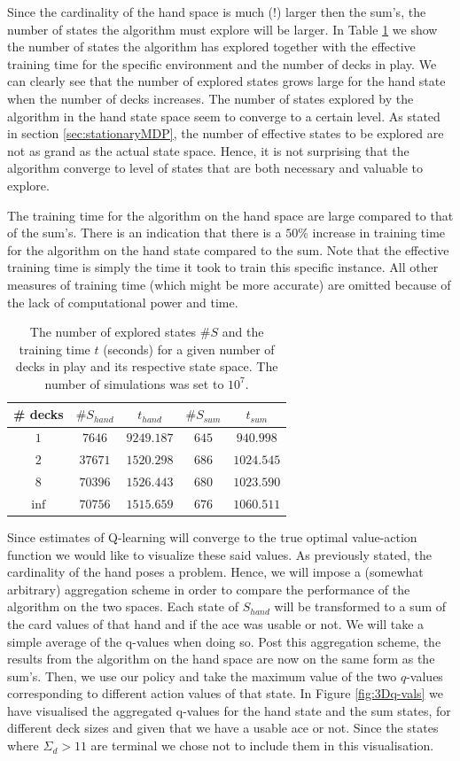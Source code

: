 Since the cardinality of the hand space is much (!) larger then the sum's, the number of states the algorithm must explore 
will be larger. In Table \ref{tab:state_visited} we show the number of states the algorithm has explored together with the 
effective training time for the specific environment and the number of decks in play. We can clearly see that the number of 
explored states grows large for the hand state when the number of decks increases. The number of states explored by the 
algorithm in the hand state space seem to converge to a certain level. As stated in section \ref{sec:stationaryMDP}, the 
number of effective states to be explored are not as grand as the actual state space. Hence, it is not surprising that the 
algorithm converge to level of states that are both necessary and valuable to explore. 

The training time for the algorithm on the hand space are large compared to that of the sum's. 
There is an indication that there is a $50\%$ increase in training time for the algorithm on the hand state compared to the 
sum. Note that the effective training time is simply the time it took to train this specific instance. 
All other measures of training time (which might be more accurate) are omitted because of the lack of computational 
power and time.
\begin{table}[h!]
\centering
 \begin{tabular}{c|cc|cc}
  \# decks & $\#S_{hand}$ & $t_{hand}$ & $\#S_{sum}$ &  $t_{sum}$  \\
  \hline 
  $1$ & $7646$ & $9249.187$ & $645$ & $940.998$ \\
  $2$ & $37671$ & $1520.298$ & $686$ & $1024.545$ \\
  $8$ & $70396$ & $1526.443$ & $680$ & $1023.590$ \\
  $\inf$ & $70756$ & $1515.659$ & $676$ & $1060.511$ 
 \end{tabular} 
 \caption{The number of explored states $\#S$ and the training time $t$ (seconds) for a given number of decks in play and its respective state space. The number of simulations was set to $10^7$.\label{tab:state_visited}}
\end{table}

Since estimates of Q-learning will converge to the true optimal value-action function we would like to visualize these 
said values. As previously stated, the cardinality of the hand poses a problem. Hence, we will impose a (somewhat arbitrary) 
aggregation scheme in order to compare the performance of the algorithm on the two spaces. Each state of $S_{hand}$ will be 
transformed to a sum of the card values of that hand and if the ace was usable or not. We will take a simple average of the 
q-values when doing so. Post this aggregation scheme, the results from the algorithm on the hand space are now on the same 
form as the sum's. Then, we use our policy and take the maximum value of the two $q$-values corresponding to different 
action values of that state. In Figure \ref{fig:3Dq-vals} we have visualised the aggregated q-values for the hand state 
and the sum states, for different deck sizes and given that we have a usable ace or not. Since the states where 
$\Sigma_d > 11$ are terminal we chose not to include them in this visualisation.

